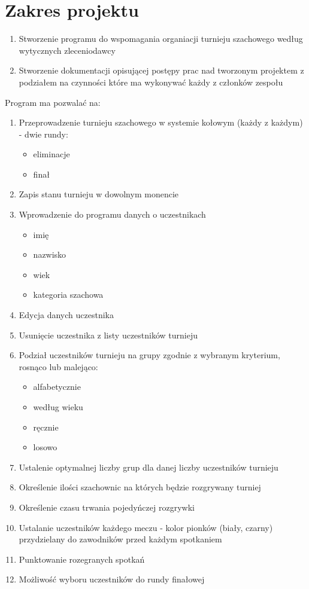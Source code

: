 \section{Zakres projektu}
\begin{enumerate}
	\item Stworzenie programu do wspomagania organiacji turnieju szachowego według wytycznych zleceniodawcy
	\item Stworzenie dokumentacji opisującej postępy prac nad tworzonym projektem z podziałem na czynności które ma wykonywać każdy z członków zespołu
\end{enumerate}
Program ma pozwalać na:
\begin{enumerate}
	\item Przeprowadzenie turnieju szachowego w systemie kołowym (każdy z każdym) - dwie rundy:
	\begin{itemize}
		\item eliminacje
		\item finał
	\end{itemize}
	\item Zapis stanu turnieju w dowolnym monencie
	
	\item Wprowadzenie do programu danych o uczestnikach
	\begin{itemize}
		\item imię
		\item nazwisko
		\item wiek
		\item kategoria szachowa
	\end{itemize}
	\item Edycja danych uczestnika
	\item Usunięcie uczestnika z listy uczestników turnieju 
	\item Podział uczestników turnieju na grupy zgodnie z wybranym kryterium, rosnąco lub malejąco:
	\begin{itemize}
		\item alfabetycznie
		\item według wieku
		\item ręcznie
		\item losowo
	\end{itemize}
	\item Ustalenie optymalnej liczby grup dla danej liczby uczestników turnieju
	\item Określenie ilości szachownic na których będzie rozgrywany turniej
	\item Określenie czasu trwania pojedyńczej rozgrywki
	
	\item Ustalanie uczestników każdego meczu - kolor pionków (biały, czarny) przydzielany do zawodników przed każdym spotkaniem 
	\item Punktowanie rozegranych spotkań
	\item Możliwość wyboru uczestników do rundy finałowej
\end{enumerate}


